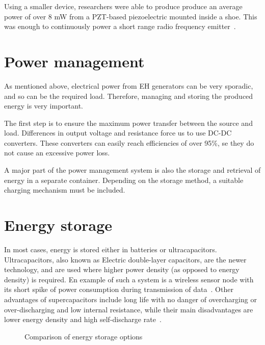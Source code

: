 \documentclass[a4paper,10pt]{article}
\begin{document}
Using a smaller device, researchers were able to produce produce an average power of over 8 mW from a \ac{PZT}-based piezoelectric mounted inside a shoe. This was enough to continuously power a short range radio frequency emitter~\cite{piezo-shoe-ieee}. 


\section{Power management}

As mentioned above, electrical power from \ac{EH} generators can be very sporadic, and so can be the required load. Therefore, managing and storing the produced energy is very important. 

The first step is to ensure the maximum power transfer between the source and load. Differences in output voltage and resistance force us to use DC-DC converters. These converters can easily reach efficiencies of over 95\%, se they do not cause an excessive power loss. 

A major part of the power management system is also the storage and retrieval of energy in a separate container. Depending on the storage method, a suitable charging mechanism must be included. 

\section{Energy storage}

In most cases, energy is stored either in batteries or ultracapacitors. Ultracapacitors, also known as Electric double-layer capacitors, are the newer technology, and are used where higher power density (as opposed to energy density) is required. En example of such a system is a wireless sensor node with its short spike of power consumption during transmission of data~\cite{cap-wsn-ieee}. Other advantages of supercapacitors include long life with no danger of overcharging or over-discharging and low internal resistance, while their main disadvantages are lower energy density and high self-discharge rate~\cite{wiki:edlc}. 

\begin{figure}[!h]
\def\svgwidth{0.8\textwidth}
 
\caption{Comparison of energy storage options~\cite{wiki:edlc}}
\label{fig:storage-chart}
\end{figure}
\end{document}
